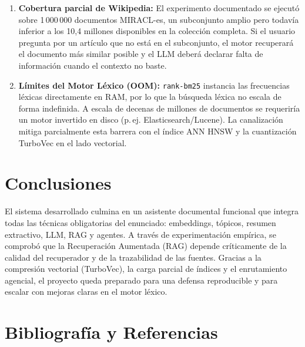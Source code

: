 \documentclass[11pt,a4paper]{article}
\newcommand{\code}[1]{\texttt{#1}}
\begin{document}
\begin{enumerate}
  \item \textbf{Cobertura parcial de Wikipedia:} El experimento documentado se ejecutó sobre 1\,000\,000 documentos MIRACL-es, un subconjunto amplio pero todavía inferior a los 10,4 millones disponibles en la colección completa. Si el usuario pregunta por un artículo que no está en el subconjunto, el motor recuperará el documento más similar posible y el LLM deberá declarar falta de información cuando el contexto no baste.
  \item \textbf{Límites del Motor Léxico (OOM):} \code{rank-bm25} instancia las frecuencias léxicas directamente en RAM, por lo que la búsqueda léxica no escala de forma indefinida. A escala de decenas de millones de documentos se requeriría un motor invertido en disco (p.\,ej. Elasticsearch/Lucene). La canalización mitiga parcialmente esta barrera con el índice ANN HNSW y la cuantización TurboVec en el lado vectorial.
\end{enumerate}

\section{Conclusiones}

El sistema desarrollado culmina en un asistente documental funcional que integra todas las técnicas obligatorias del enunciado: embeddings, tópicos, resumen extractivo, LLM, RAG y agentes.
A través de experimentación empírica, se comprobó que la Recuperación Aumentada (RAG) depende críticamente de la calidad del recuperador y de la trazabilidad de las fuentes. Gracias a la compresión vectorial (TurboVec), la carga parcial de índices y el enrutamiento agencial, el proyecto queda preparado para una defensa reproducible y para escalar con mejoras claras en el motor léxico.

\section*{Bibliografía y Referencias}
\end{document}
